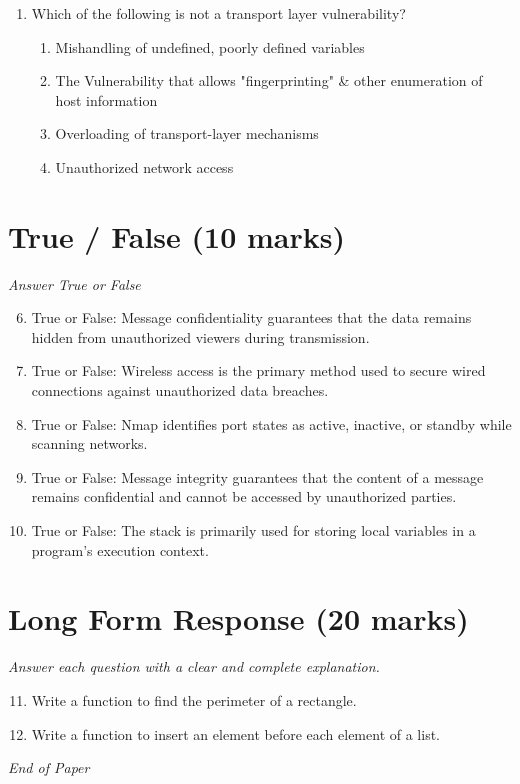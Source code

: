 \documentclass[12pt]{article}
\begin{document}
\begin{enumerate}[label=\arabic*.]
\begin{enumerate}[label=(\alph*)]
    \item To locate firewalls
\end{enumerate}
\item Which of the following is not a transport layer vulnerability?
\begin{enumerate}[label=(\alph*)]
    \item Mishandling of undefined, poorly defined variables
    \item The Vulnerability that allows "fingerprinting" \& other enumeration of host information
    \item Overloading of transport-layer mechanisms
    \item Unauthorized network access
\end{enumerate}
\end{enumerate}

\section*{True / False (10 marks)}
\textit{Answer True or False}
\begin{enumerate}[label=\arabic*.]
\setcounter{enumi}{5}
\item True or False: Message confidentiality guarantees that the data remains hidden from unauthorized viewers during transmission.
\item True or False: Wireless access is the primary method used to secure wired connections against unauthorized data breaches.
\item True or False: Nmap identifies port states as active, inactive, or standby while scanning networks.
\item True or False: Message integrity guarantees that the content of a message remains confidential and cannot be accessed by unauthorized parties.
\item True or False: The stack is primarily used for storing local variables in a program's execution context.
\end{enumerate}

\section*{Long Form Response (20 marks)}
\textit{Answer each question with a clear and complete explanation.}
\begin{enumerate}[label=\arabic*.]
\setcounter{enumi}{10}
\item Write a function to find the perimeter of a rectangle.
\item Write a function to insert an element before each element of a list.
\end{enumerate}

\vfill
\noindent\textit{End of Paper}
\end{document}
